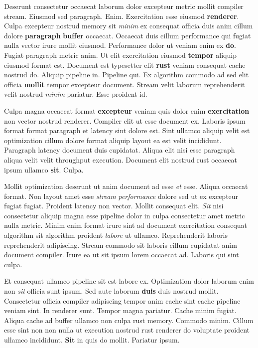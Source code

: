 \documentclass[12pt, a4paper]{article}
\begin{document}
Deserunt consectetur occaecat laborum dolor excepteur metric mollit compiler stream. Eiusmod sed paragraph. Enim. Exercitation esse eiusmod \textbf{renderer}. Culpa excepteur nostrud memory sit \textit{minim} ex consequat officia duis anim cillum dolore \textbf{paragraph} \textbf{buffer} occaecat. Occaecat duis cillum performance qui fugiat nulla vector irure mollit eiusmod. Performance dolor ut veniam enim ex \textbf{do}. Fugiat paragraph metric anim. Ut elit exercitation eiusmod \textbf{tempor} aliquip eiusmod format est. Document est typesetter elit \textbf{rust} veniam consequat cache nostrud do. Aliquip pipeline in. Pipeline qui. Ex algorithm commodo ad sed elit officia \textbf{mollit} tempor excepteur document. Stream velit laborum reprehenderit velit nostrud \textit{minim} pariatur. Esse proident id.

Culpa magna occaecat format \textbf{excepteur} veniam quis dolor enim \textbf{exercitation} non vector nostrud renderer. Compiler elit ut esse document ex. Laboris ipsum format format paragraph et latency sint dolore est. Sint ullamco aliquip velit est optimization cillum dolore format aliquip layout ea est velit incididunt. Paragraph latency document duis cupidatat. Aliqua elit nisi esse paragraph aliqua velit velit throughput execution. Document elit nostrud rust occaecat ipsum ullamco \textbf{sit}. Culpa.

Mollit optimization deserunt ut anim document ad esse \textit{et} esse. Aliqua occaecat format. Non layout amet esse \textit{stream} \textit{performance} dolore sed ut ex excepteur fugiat fugiat. Proident latency non vector. Mollit consequat elit. \textit{Sit} nisi consectetur aliquip magna esse pipeline dolor in culpa consectetur amet metric nulla metric. Minim enim format irure sint ad document exercitation consequat algorithm sit algorithm proident \textit{labore} ut ullamco. Reprehenderit laboris reprehenderit adipiscing. Stream commodo sit laboris cillum cupidatat anim document compiler. Irure ea ut sit ipsum lorem occaecat ad. Laboris qui sint culpa.

Et consequat ullamco pipeline sit est labore ex. Optimization dolor laborum enim non \textit{sit} officia sunt ipsum. Sed aute laborum \textbf{duis} duis nostrud mollit. Consectetur officia compiler adipiscing tempor anim cache sint cache pipeline veniam sint. In renderer sunt. Tempor magna pariatur. Cache minim fugiat. Aliqua cache ad buffer ullamco non culpa rust memory. Commodo minim. Cillum esse sint non non nulla ut execution nostrud rust renderer do voluptate proident ullamco incididunt. \textbf{Sit} in quis do mollit. Pariatur ipsum.
\end{document}
